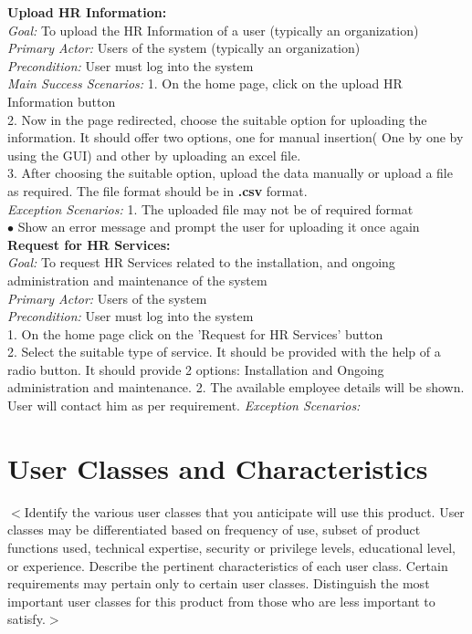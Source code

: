 \documentclass{scrreprt}
\begin{document}
\textbf{Upload HR Information:}\\
\textit{Goal: } To upload the HR Information of a user (typically an organization)\\
\textit{Primary Actor: } Users of the system (typically an organization)\\
\textit{Precondition: } User must log into the system\\
\textit{Main Success Scenarios: }1. On the home page, click on the upload HR Information button\\
2. Now in the page redirected, choose the suitable option for uploading the information. It should offer two options, one for manual insertion( One by one by using the GUI) and other by uploading an excel file.\\
3. After choosing the suitable option, upload the data manually or upload a file as required. The file format should be in \textbf{.csv} format.\\
\textit{Exception Scenarios: } 1. The uploaded file may not be of required format\\
$\bullet$ Show an error message and prompt the user for uploading it once again\\

\textbf{Request for HR Services: }\\
\textit{Goal: } To request HR Services related to the installation, and ongoing administration
and maintenance of the system\\
\textit{Primary Actor: } Users of the system\\
\textit{Precondition: } User must log into the system\\
1. On the home page click on the 'Request for HR Services' button\\
2. Select the suitable type of service. It should be provided with the help of a radio button. It should provide 2 options:
Installation and Ongoing administration and maintenance.
2. The available employee details will be shown. User will contact him as per requirement.
\textit{Exception Scenarios: }


\section{User Classes and Characteristics}
$<$Identify the various user classes that you anticipate will use this product.  
User classes may be differentiated based on frequency of use, subset of product 
functions used, technical expertise, security or privilege levels, educational 
level, or experience. Describe the pertinent characteristics of each user class.  
Certain requirements may pertain only to certain user classes. Distinguish the 
most important user classes for this product from those who are less important 
to satisfy.$>$
\end{document}
